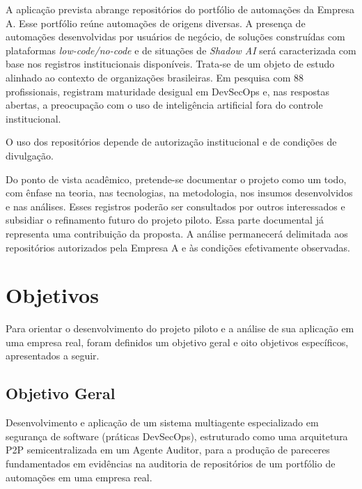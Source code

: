 A aplicação prevista abrange repositórios do portfólio de automações da Empresa A. Esse portfólio reúne automações de origens diversas. A presença de automações desenvolvidas por usuários de negócio, de soluções construídas com plataformas \textit{low-code/no-code} e de situações de \textit{Shadow AI} será caracterizada com base nos registros institucionais disponíveis. Trata-se de um objeto de estudo alinhado ao contexto de organizações brasileiras. Em pesquisa com 88 profissionais,  registram maturidade desigual em DevSecOps e, nas respostas abertas, a preocupação com o uso de inteligência artificial fora do controle institucional.

O uso dos repositórios depende de autorização institucional e de condições de divulgação.

Do ponto de vista acadêmico, pretende-se documentar o projeto como um todo, com ênfase na teoria, nas tecnologias, na metodologia, nos insumos desenvolvidos e nas análises. Esses registros poderão ser consultados por outros interessados e subsidiar o refinamento futuro do projeto piloto. Essa parte documental já representa uma contribuição da proposta. A análise permanecerá delimitada aos repositórios autorizados pela Empresa A e às condições efetivamente observadas.

\section{Objetivos}
\label{intro-objetivos}

Para orientar o desenvolvimento do projeto piloto e a análise de sua aplicação em uma empresa real, foram definidos um objetivo geral e oito objetivos específicos, apresentados a seguir.

\subsection{Objetivo Geral}
\label{intro-objetivo-geral}

Desenvolvimento e aplicação de um sistema multiagente especializado em segurança de software (práticas DevSecOps), estruturado como uma arquitetura P2P semicentralizada em um Agente Auditor, para a produção de pareceres fundamentados em evidências na auditoria de repositórios de um portfólio de automações em uma empresa real.

